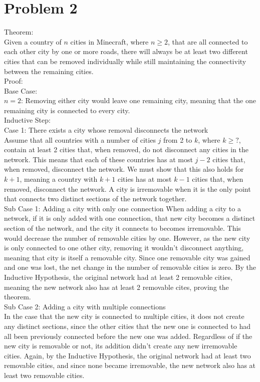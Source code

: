 \documentclass{article}
\begin{document}
\section*{Problem 2}
Theorem:\\
Given a country of $n$ cities in Minecraft, where $n\geq2$, that are all connected to each other city by one or more roads, there will always be at least two different cities that can be removed individually while still maintaining the connectivity between the remaining cities.\\
\newline
Proof:\\
Base Case:\\
$n=2$: Removing either city would leave one remaining city, meaning that the one remaining city is connected to every city.\\
\newline
Inductive Step:\\
Case 1: There exists a city whose removal disconnects the network\\
Assume that all countries with a number of cities $j$ from 2 to $k$, where $k\geq ?$, contain at least 2 cities that, when removed, do not disconnect any cities in the network. This means that each of these countries has at most $j-2$ cities that, when removed, disconnect the network. We must show that this also holds for $k+1$, meaning a country with $k+1$ cities has at most $k-1$ cities that, when removed, disconnect the network. A city is irremovable when it is the only point that connects two distinct sections of the network together.\\
Sub Case 1: Adding a city with only one connection
When adding a city to a network, if it is only added with one connection, that new city becomes a distinct section of the network, and the city it connects to becomes irremovable. This would decrease the number of removable cities by one. However, as the new city is only connected to one other city, removing it wouldn't disconnect anything, meaning that city is itself a removable city. Since one removable city was gained and one was lost, the net change in the number of removable cities is zero. By the Inductive Hypothesis, the original network had at least 2 removable cities, meaning the new network also has at least 2 removable cites, proving the theorem.\\
Sub Case 2: Adding a city with multiple connections\\
In the case that the new city is connected to multiple cities, it does not create any distinct sections, since the other cities that the new one is connected to had all been previously connected before the new one was added. Regardless of if the new city is removable or not, its addition didn't create any new irremovable cities. Again, by the Inductive Hypothesis, the original network had at least two removable cities, and since none became irremovable, the new network also has at least two removable cities.\\
\end{document}
